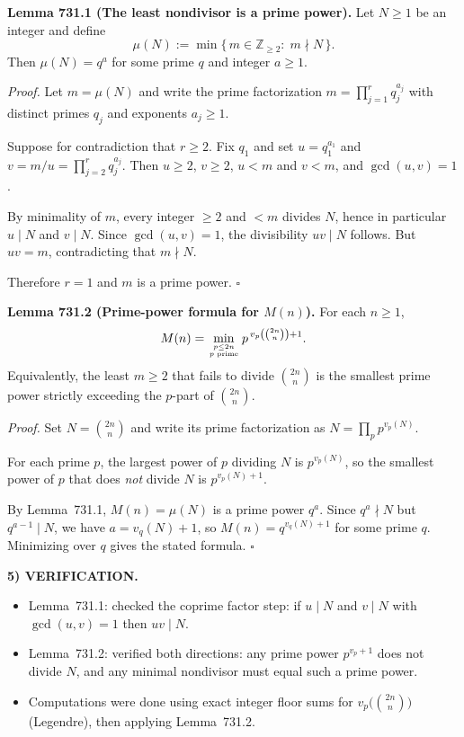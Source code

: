 \medskip
\noindent\textbf{Lemma 731.1 (The least nondivisor is a prime power).}
Let $N\ge 1$ be an integer and define
\[
\mu(N):=\min\{\,m\in\mathbb Z_{\ge 2}:\; m\nmid N\,\}.
\]
Then $\mu(N)=q^a$ for some prime $q$ and integer $a\ge 1$.

\noindent\emph{Proof.}
Let $m=\mu(N)$ and write the prime factorization $m=\prod_{j=1}^r q_j^{a_j}$ with distinct primes $q_j$ and exponents $a_j\ge 1$.

Suppose for contradiction that $r\ge 2$. Fix $q_1$ and set $u=q_1^{a_1}$ and $v=m/u=\prod_{j=2}^r q_j^{a_j}$. Then $u\ge 2$, $v\ge 2$, $u<m$ and $v<m$, and $\gcd(u,v)=1$.

By minimality of $m$, every integer $\ge 2$ and $<m$ divides $N$, hence in particular $u\mid N$ and $v\mid N$. Since $\gcd(u,v)=1$, the divisibility $uv\mid N$ follows. But $uv=m$, contradicting that $m\nmid N$.

Therefore $r=1$ and $m$ is a prime power. \hfill $\square$

\medskip
\noindent\textbf{Lemma 731.2 (Prime-power formula for $M(n)$).}
For each $n\ge 1$,
\[
M(n)=\min_{p\le 2n\atop p\text{ prime}} p^{\,v_p\left(\binom{2n}{n}\right)+1}.
\]
Equivalently, the least $m\ge 2$ that fails to divide $\binom{2n}{n}$ is the smallest prime power strictly exceeding the $p$-part of $\binom{2n}{n}$.

\noindent\emph{Proof.}
Set $N=\binom{2n}{n}$ and write its prime factorization as $N=\prod_p p^{v_p(N)}$.

For each prime $p$, the largest power of $p$ dividing $N$ is $p^{v_p(N)}$, so the smallest power of $p$ that does \emph{not} divide $N$ is $p^{v_p(N)+1}$.

By Lemma~731.1, $M(n)=\mu(N)$ is a prime power $q^a$. Since $q^a\nmid N$ but $q^{a-1}\mid N$, we have $a=v_q(N)+1$, so $M(n)=q^{v_q(N)+1}$ for some prime $q$. Minimizing over $q$ gives the stated formula.
\hfill $\square$

\medskip
\noindent\textbf{5) VERIFICATION.}

\begin{itemize}
\item Lemma~731.1: checked the coprime factor step: if $u\mid N$ and $v\mid N$ with $\gcd(u,v)=1$ then $uv\mid N$.
\item Lemma~731.2: verified both directions: any prime power $p^{v_p+1}$ does not divide $N$, and any minimal nondivisor must equal such a prime power.
\item Computations were done using exact integer floor sums for $v_p\bigl(\binom{2n}{n}\bigr)$ (Legendre), then applying Lemma~731.2.
\end{itemize}

